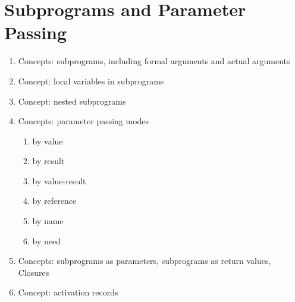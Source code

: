 \section{Subprograms and Parameter Passing}\label{sec:Subprograms}

\begin{enumerate}[noitemsep]
\item Concepts: subprograms, including formal arguments and actual arguments
\item Concept: local variables in subprograms
\item Concept: nested subprograms
\item Concepts: parameter passing modes
  \begin{enumerate}[noitemsep]
  \item by value
  \item by result
  \item by value-result
  \item by reference
  \item by name
  \item by need
  \end{enumerate}
\item Concepts: subprograms as parameters, subprograms as return values, Closures
\item Concept: activation records
\end{enumerate}

